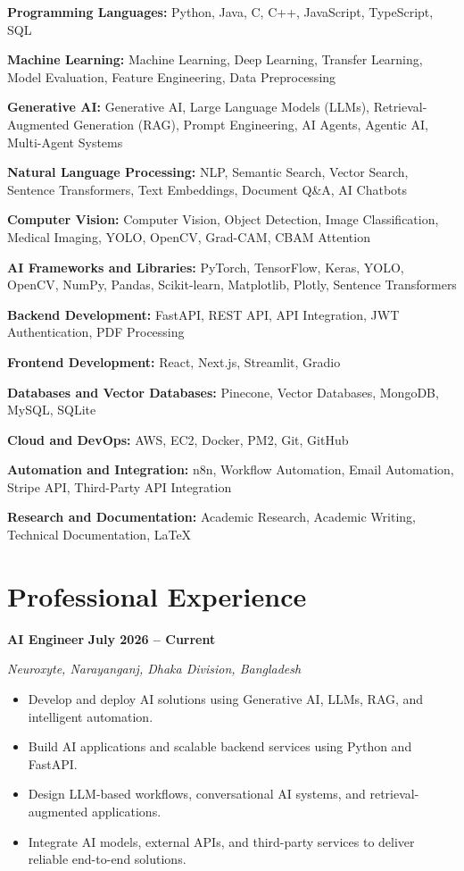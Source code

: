 ﻿\documentclass[10pt,a4paper]{article}
\begin{document}
\textbf{Programming Languages:}
Python, Java, C, C++, JavaScript, TypeScript, SQL

\textbf{Machine Learning:}
Machine Learning, Deep Learning, Transfer Learning, Model Evaluation, Feature Engineering, Data Preprocessing

\textbf{Generative AI:}
Generative AI, Large Language Models (LLMs), Retrieval-Augmented Generation (RAG), Prompt Engineering, AI Agents, Agentic AI, Multi-Agent Systems

\textbf{Natural Language Processing:}
NLP, Semantic Search, Vector Search, Sentence Transformers, Text Embeddings, Document Q\&A, AI Chatbots

\textbf{Computer Vision:}
Computer Vision, Object Detection, Image Classification, Medical Imaging, YOLO, OpenCV, Grad-CAM, CBAM Attention

\textbf{AI Frameworks and Libraries:}
PyTorch, TensorFlow, Keras, YOLO, OpenCV, NumPy, Pandas, Scikit-learn, Matplotlib, Plotly, Sentence Transformers

\textbf{Backend Development:}
FastAPI, REST API, API Integration, JWT Authentication, PDF Processing

\textbf{Frontend Development:}
React, Next.js, Streamlit, Gradio

\textbf{Databases and Vector Databases:}
Pinecone, Vector Databases, MongoDB, MySQL, SQLite

\textbf{Cloud and DevOps:}
AWS, EC2, Docker, PM2, Git, GitHub

\textbf{Automation and Integration:}
n8n, Workflow Automation, Email Automation, Stripe API, Third-Party API Integration

\textbf{Research and Documentation:}
Academic Research, Academic Writing, Technical Documentation, LaTeX


\section{Professional Experience}

\textbf{AI Engineer}
\hfill
\textbf{July 2026 -- Current}

\textit{Neuroxyte, Narayanganj, Dhaka Division, Bangladesh}

\begin{itemize}

\item Develop and deploy AI solutions using Generative AI, LLMs, RAG, and intelligent automation.

\item Build AI applications and scalable backend services using Python and FastAPI.

\item Design LLM-based workflows, conversational AI systems, and retrieval-augmented applications.

\item Integrate AI models, external APIs, and third-party services to deliver reliable end-to-end solutions.

\end{itemize}
\end{document}
